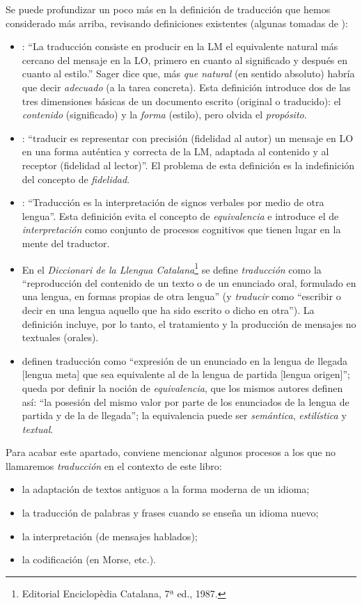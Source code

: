Se puede profundizar un poco más en la definición de traducción que hemos considerado más arriba, revisando definiciones existentes (algunas tomadas de \citealt{sager93b}): \begin{itemize} \item \citet[p.~19]{nida59b}: ``La traducción consiste en producir en la LM el equivalente natural más cercano del mensaje en la LO, primero en cuanto al significado y después en cuanto al estilo.'' Sager dice que, más \emph{que natural} (en sentido absoluto) habría que decir \emph{adecuado} (a la tarea concreta). Esta definición introduce dos de las tres dimensiones básicas de un documento escrito (original o traducido): el \emph{contenido} (significado) y la \emph{forma} (estilo), pero olvida el \emph{propósito}. \item \citet{flamand83b}: ``traducir es representar con precisión (fidelidad al autor) un mensaje en LO en una forma auténtica y correcta de la LM, adaptada al contenido y al receptor (fidelidad al lector)''. El problema de esta definición es la indefinición del concepto de \emph{fidelidad}. \item \citet{jakobson66b}: ``Traducción es la interpretación de signos verbales por medio de otra lengua''. Esta definición evita el concepto de \emph{equivalencia} e introduce el de \emph{interpretación} como conjunto de procesos cognitivos que tienen lugar en la mente del traductor. \item En el \emph{Diccionari de la Llengua Catalana}\footnote{Editorial Enciclopèdia Catalana, 7ª ed., 1987.} se define {\em traducción} como la ``reproducción del contenido de un texto o de un enunciado oral, formulado en una lengua, en formas propias de otra lengua'' (y \emph{traducir} como ``escribir o decir en una lengua aquello que ha sido escrito o dicho en otra''). La definición incluye, por lo tanto, el tratamiento y la producción de mensajes no textuales (orales). \item \citet{alcaraz97b} definen traducción como ``expresión de un enunciado en la lengua de llegada [lengua meta] que sea equivalente al de la lengua de partida [lengua origen]''; queda por definir la noción de \emph{equivalencia}, que los mismos autores definen así: ``la posesión del mismo valor por parte de los enunciados de la lengua de partida y de la de llegada''; la equivalencia puede ser {\em semántica}, \emph{estilística} y \emph{textual}. \end{itemize} 

Para acabar este apartado, conviene mencionar algunos procesos a los que no llamaremos \emph{traducción} en el contexto de este libro: \begin{itemize} \item la adaptación de textos antiguos a la forma moderna de un idioma; \item la traducción de palabras y frases cuando se enseña un idioma nuevo; \item la interpretación (de mensajes hablados); \item la codificación (en Morse, etc.). \end{itemize} 

